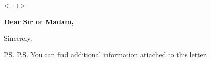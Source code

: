 \documentclass[a4paper]{letter}
\begin{document}
\begin{letter}{<++>}
\opening{\textbf{Dear Sir or Madam,}}

 

\vspace{2\parskip} %
\closing{Sincerely,}
\vspace{2\parskip} %
\ps{P.S. You can find additional information attached to this letter.} %
\encl{<++>} %

\end{letter}
 
\end{document}
